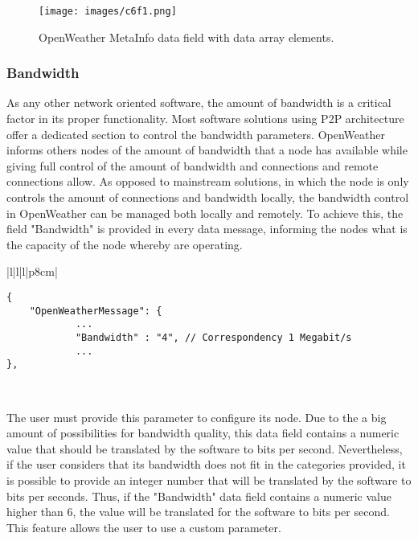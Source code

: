 \begin{figure}[H]
\centerline{\texttt{[image: images/c6f1.png]}}
\caption{OpenWeather MetaInfo data field with data array elements.}
\end{figure}


\subsubsection{Bandwidth}

As any other network oriented software, the amount of bandwidth is a critical factor in its proper functionality. Most software solutions using \gls{P2P} architecture offer a dedicated section to control the bandwidth parameters. OpenWeather informs others nodes of the amount of bandwidth that a node has available while giving full control of the amount of bandwidth and connections and remote connections allow. As opposed to mainstream solutions, in which the node is only controls the amount of connections and bandwidth locally, the bandwidth control in OpenWeather can be managed both locally and remotely. To achieve this, the field "Bandwidth" is provided in every data message, informing the nodes what is the capacity of the node whereby are operating.

\begin{table}[H]
\centering
\begin{tabular}{|l|l|l|p{8cm}|}
\hline
\begin{minipage}[t]{\linewidth}
	\begin{verbatim}
{
    "OpenWeatherMessage": {
            ...
            "Bandwidth" : "4", // Correspondency 1 Megabit/s
            ...
},
      \end{verbatim}
\end{minipage} \\
\hline
\end{tabular}
\caption{Bandwidth field in a data message of OpenWeather}
\end{table}

The user must provide this parameter to configure its node.  Due to the a big amount of possibilities for bandwidth quality, this data field contains a numeric value that should be translated by the software to bits per second. Nevertheless, if the user considers that its bandwidth does not fit in the categories provided, it is possible to provide an integer number that will be translated by the software to bits per seconds. Thus, if the "Bandwidth" data field contains a numeric value higher than 6, the value will be translated for the software to bits per second. This feature allows the user to use a custom parameter.

